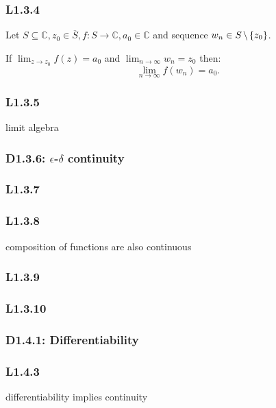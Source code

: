 \documentclass{article}
\begin{document}
\begin{multicols*}{3}
\subsubsection*{L1.3.4}
Let $S\subseteq\mathbb{C}, z_0\in\overline{S},
f:S\rightarrow\mathbb{C},a_0\in\mathbb{C}$ and sequence
$w_n\in S\hspace{0.02in}\backslash\hspace{0.02in}\{z_0\}$.

If $\displaystyle\lim_{z\rightarrow z_0}f(z)=a_0$
and $\displaystyle\lim_{n\rightarrow\infty}w_n=z_0$
then:
$$\lim_{n\rightarrow\infty}f(w_n)=a_0.$$

\subsubsection*{L1.3.5}
limit algebra

\subsubsection*{D1.3.6: $\epsilon$-$\delta$ continuity}

\subsubsection*{L1.3.7}

\subsubsection*{L1.3.8}
composition of functions are also continuous

\subsubsection*{L1.3.9}

\subsubsection*{L1.3.10}

\newcolumn

\subsubsection*{D1.4.1: Differentiability}

\subsubsection*{L1.4.3}
differentiability implies continuity


\end{multicols*}
\end{document}
